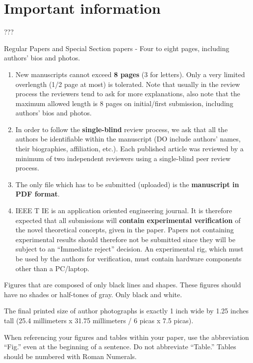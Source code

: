 \documentclass[journal]{IEEEtranTIE}
\begin{document}
\section{Important information}

 ???

Regular Papers and Special Section papers - Four to eight pages, including authors' bios and photos.

\begin{enumerate}[1)]
	\item New manuscripts cannot exceed \textbf{8 pages} (3 for letters). Only a very limited overlength (1/2 page at most) is tolerated. Note that usually in the review process the reviewers tend to ask for more explanations, also note that the maximum allowed length is 8 pages on initial/first submission, including authors' bios and photos.
	\item In order to follow the \textbf{single-blind} review process, we ask that all the authors be identifiable within the manuscript (DO include authors' names, their biographies, affiliation, etc.). Each published article was reviewed by a minimum of two independent reviewers using a single-blind peer review process.
	\item The only file which has to be submitted (uploaded) is the \textbf{manuscript in PDF format}.
	\item IEEE T IE is an application oriented engineering journal. It is therefore expected that all submissions will \textbf{contain experimental verification} of the novel theoretical concepts, given in the paper. Papers not containing experimental results should therefore not be submitted since they will be subject to an ``Immediate reject'' decision. An experimental rig, which must be used by the authors for verification, must contain hardware components other than a PC/laptop.	
\end{enumerate}

Figures that are composed of only black lines and shapes. These figures should have no shades or half-tones of gray. Only black and white.

The final printed size of author photographs is exactly
1 inch wide by 1.25 inches tall (25.4 millimeters x 31.75 millimeters / 6 picas x 7.5 picas).

When referencing your figures and tables within your paper, use the abbreviation ``Fig.'' even at the beginning of a sentence. Do not abbreviate ``Table.'' Tables should be numbered with Roman Numerals.
\end{document}
